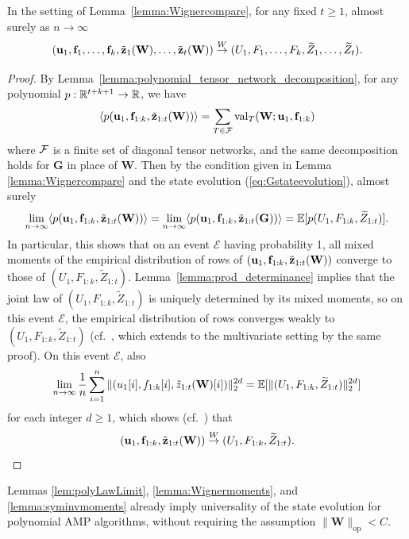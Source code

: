 \documentclass[10pt,reqno]{amsart}
\def\u{\mathbf{u}}
\def\f{\mathbf{f}}
\def\W{\mathbf{W}}
\def\G{\mathbf{G}}
\def\cE{\mathcal{E}}
\def\val{\operatorname{val}}
\def\op{\mathrm{op}}
\def\toW{\overset{W}{\to}}
\def\bW{{\mathbf{W}}}
\begin{document}
\begin{lemma}\label{lem:polyLawLimit}
In the setting of Lemma~\ref{lemma:Wignercompare}, for any fixed $t \geq 1$,
almost surely as $n \to \infty$
\[(\ub_1, \fb_1, \ldots, \fb_k, \tilde\zb_1(\W), \ldots, \tilde\zb_t(\bW)) 
\toW (U_1,F_1, \ldots, F_k,\widetilde Z_1, \ldots, \widetilde Z_t).\]
\end{lemma}
\begin{proof}
By Lemma~\ref{lemma:polynomial_tensor_network_decomposition}, for any polynomial 
$p: \mathbb{R}^{t+k+1} \to \mathbb{R}$, we have 
\begin{align*}
    \langle p(\u_1,\f_{1:k},\tilde\zb_{1:t}(\W))\rangle = \sum_{T \in \cF} 
    \val_T(\bW; \ub_1, \fb_{1:k})
\end{align*}
where $\mathcal{F}$ is a finite set of diagonal tensor networks, and the same
decomposition holds for $\G$ in place of $\bW$. 
Then by the condition given in Lemma
\ref{lemma:Wignercompare} and the state evolution (\ref{eq:Gstateevolution}),
almost surely
\begin{equation}\label{eq:polyconvergence}
\lim_{n \to \infty} \langle p(\u_1,\f_{1:k},\tilde\zb_{1:t}(\W)) \rangle
=\lim_{n \to \infty} \langle p(\u_1,\f_{1:k},\tilde\zb_{1:t}(\G)) \rangle
=\EE[p(U_1,F_{1:k},\widetilde Z_{1:t})].
\end{equation}
In particular, this shows that on an event $\cE$ having probability 1,
all mixed moments of the empirical distribution of rows of
$(\u_1,\f_{1:k},\tilde\zb_{1:t}(\W))$ converge to those of
$(U_1,F_{1:k},\widetilde Z_{1:t})$.
Lemma~\ref{lemma:prod_determinance} implies that the joint law of
$(U_1,F_{1:k},\widetilde Z_{1:t})$ is uniquely determined by its mixed moments,
so on this event $\cE$, the empirical distribution of rows converges weakly to
$(U_1,F_{1:k},\widetilde Z_{1:t})$
(cf.\ \cite[Theorem 30.2]{billingsley1995probability}, which extends to the
multivariate setting by the same proof). On this event $\cE$, also
\[\lim_{n \to \infty} \frac{1}{n}\sum_{i=1}^n
\|(u_1[i],f_{1:k}[i],\tilde z_{1:t}(\W)[i])\|_2^{2d}
=\EE[\|(U_1,F_{1:k},\widetilde Z_{1:t})\|_2^{2d}]\]
for each integer $d \geq 1$, which shows (cf.\ \cite[Definition 6.8 and Theorem
6.9]{villani2009optimal}) that
\[(\u_1,\f_{1:k},\tilde\zb_{1:t}(\W)) \toW
(U_1,F_{1:k},\widetilde Z_{1:t}).\]
\end{proof}

\begin{remark}\label{remark:polynomialuniversality}
Lemmas \ref{lem:polyLawLimit}, \ref{lemma:Wignermoments}, and
\ref{lemma:syminvmoments} already imply
universality of the state evolution for polynomial AMP algorithms, 
without requiring the assumption $\|\W\|_{\op}<C$.
\end{remark}
\end{document}
